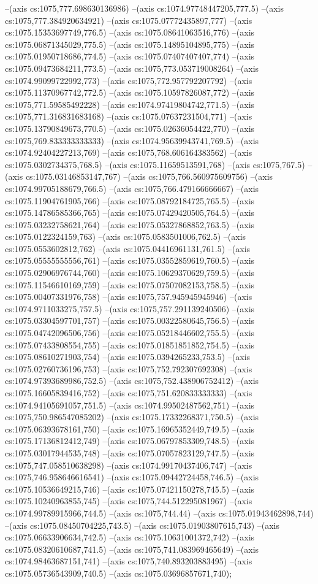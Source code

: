 --(axis cs:1075,777.698630136986)
--(axis cs:1074.97748447205,777.5)
--(axis cs:1075,777.384920634921)
--(axis cs:1075.07772435897,777)
--(axis cs:1075.15353697749,776.5)
--(axis cs:1075.08641063516,776)
--(axis cs:1075.06871345029,775.5)
--(axis cs:1075.14895104895,775)
--(axis cs:1075.01950718686,774.5)
--(axis cs:1075.07407407407,774)
--(axis cs:1075.09473684211,773.5)
--(axis cs:1075,773.053719008264)
--(axis cs:1074.99099722992,773)
--(axis cs:1075,772.957792207792)
--(axis cs:1075.11370967742,772.5)
--(axis cs:1075.10597826087,772)
--(axis cs:1075,771.59585492228)
--(axis cs:1074.97419804742,771.5)
--(axis cs:1075,771.316831683168)
--(axis cs:1075.07637231504,771)
--(axis cs:1075.13790849673,770.5)
--(axis cs:1075.02636054422,770)
--(axis cs:1075,769.833333333333)
--(axis cs:1074.95639943741,769.5)
--(axis cs:1074.92404227213,769)
--(axis cs:1075,768.606164383562)
--(axis cs:1075.0302734375,768.5)
--(axis cs:1075.11659513591,768)
--(axis cs:1075,767.5)
--(axis cs:1075.03146853147,767)
--(axis cs:1075,766.560975609756)
--(axis cs:1074.99705188679,766.5)
--(axis cs:1075,766.479166666667)
--(axis cs:1075.11904761905,766)
--(axis cs:1075.08792184725,765.5)
--(axis cs:1075.14786585366,765)
--(axis cs:1075.07429420505,764.5)
--(axis cs:1075.03232758621,764)
--(axis cs:1075.05327868852,763.5)
--(axis cs:1075.0122324159,763)
--(axis cs:1075.0583501006,762.5)
--(axis cs:1075.0553602812,762)
--(axis cs:1075.04416961131,761.5)
--(axis cs:1075.05555555556,761)
--(axis cs:1075.03552859619,760.5)
--(axis cs:1075.02906976744,760)
--(axis cs:1075.10629370629,759.5)
--(axis cs:1075.11546610169,759)
--(axis cs:1075.07507082153,758.5)
--(axis cs:1075.00407331976,758)
--(axis cs:1075,757.945945945946)
--(axis cs:1074.9711033275,757.5)
--(axis cs:1075,757.291139240506)
--(axis cs:1075.03304597701,757)
--(axis cs:1075.00322580645,756.5)
--(axis cs:1075.04742096506,756)
--(axis cs:1075.05218446602,755.5)
--(axis cs:1075.07433808554,755)
--(axis cs:1075.01851851852,754.5)
--(axis cs:1075.08610271903,754)
--(axis cs:1075.0394265233,753.5)
--(axis cs:1075.02760736196,753)
--(axis cs:1075,752.792307692308)
--(axis cs:1074.97393689986,752.5)
--(axis cs:1075,752.438906752412)
--(axis cs:1075.16605839416,752)
--(axis cs:1075,751.620833333333)
--(axis cs:1074.94105691057,751.5)
--(axis cs:1074.99502487562,751)
--(axis cs:1075,750.986547085202)
--(axis cs:1075.17332268371,750.5)
--(axis cs:1075.06393678161,750)
--(axis cs:1075.16965352449,749.5)
--(axis cs:1075.17136812412,749)
--(axis cs:1075.06797853309,748.5)
--(axis cs:1075.03017944535,748)
--(axis cs:1075.07057823129,747.5)
--(axis cs:1075,747.058510638298)
--(axis cs:1074.99170437406,747)
--(axis cs:1075,746.958646616541)
--(axis cs:1075.09442724458,746.5)
--(axis cs:1075.10536649215,746)
--(axis cs:1075.07421150278,745.5)
--(axis cs:1075.10240963855,745)
--(axis cs:1075,744.512295081967)
--(axis cs:1074.99789915966,744.5)
--(axis cs:1075,744.44)
--(axis cs:1075.01943462898,744)
--(axis cs:1075.08450704225,743.5)
--(axis cs:1075.01903807615,743)
--(axis cs:1075.06633906634,742.5)
--(axis cs:1075.10631001372,742)
--(axis cs:1075.08320610687,741.5)
--(axis cs:1075,741.083969465649)
--(axis cs:1074.98463687151,741)
--(axis cs:1075,740.893203883495)
--(axis cs:1075.05736543909,740.5)
--(axis cs:1075.03696857671,740);

